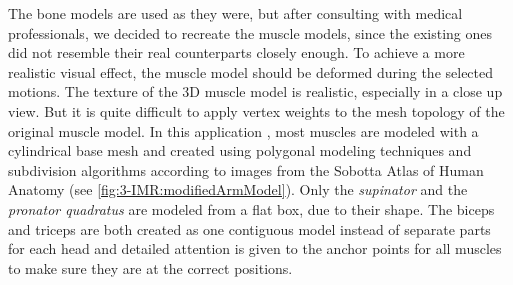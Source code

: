 The bone models are used as they were, but after consulting with medical professionals, we decided to recreate the muscle models, since the existing ones did not resemble their real counterparts closely enough. 
To achieve a more realistic visual effect, the muscle model should be deformed during the selected motions.
The texture of the 3D muscle model is realistic, especially in a close up view. But it is quite difficult to apply vertex weights to the mesh topology of the original muscle model. 
In this application , most muscles are modeled with a cylindrical base mesh and created using polygonal modeling techniques and subdivision algorithms according to images from the Sobotta Atlas of Human Anatomy (see \figurename{\ref{fig:3-IMR:modifiedArmModel}}). Only the \textit{supinator} and the \textit{pronator quadratus} are modeled from a flat box, due to their shape. The biceps and triceps are both created as one contiguous model instead of separate parts for each head and detailed attention is given to the anchor points for all muscles to make sure they are at the correct positions.
